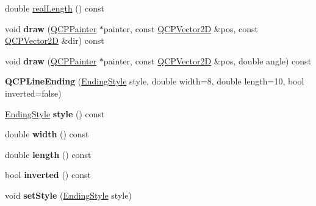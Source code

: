 \begin{DoxyCompactItemize}
\item 
double \hyperlink{class_q_c_p_line_ending_a6a528e6dc5aabe1077a573b045715f03}{real\+Length} () const 
\item 
void {\bfseries draw} (\hyperlink{class_q_c_p_painter}{Q\+C\+P\+Painter} $\ast$painter, const \hyperlink{class_q_c_p_vector2_d}{Q\+C\+P\+Vector2D} \&pos, const \hyperlink{class_q_c_p_vector2_d}{Q\+C\+P\+Vector2D} \&dir) const \hypertarget{class_q_c_p_line_ending_a59582c35dcdc23456326b7aefc929e2b}{}\label{class_q_c_p_line_ending_a59582c35dcdc23456326b7aefc929e2b}

\item 
void {\bfseries draw} (\hyperlink{class_q_c_p_painter}{Q\+C\+P\+Painter} $\ast$painter, const \hyperlink{class_q_c_p_vector2_d}{Q\+C\+P\+Vector2D} \&pos, double angle) const \hypertarget{class_q_c_p_line_ending_a045afaf5c8fa77623271d60e5d338288}{}\label{class_q_c_p_line_ending_a045afaf5c8fa77623271d60e5d338288}

\item 
{\bfseries Q\+C\+P\+Line\+Ending} (\hyperlink{class_q_c_p_line_ending_a5ef16e6876b4b74959c7261d8d4c2cd5}{Ending\+Style} style, double width=8, double length=10, bool inverted=false)\hypertarget{class_q_c_p_line_ending_abb2abc7542f0c7a3c081d878248896a4}{}\label{class_q_c_p_line_ending_abb2abc7542f0c7a3c081d878248896a4}

\item 
\hyperlink{class_q_c_p_line_ending_a5ef16e6876b4b74959c7261d8d4c2cd5}{Ending\+Style} {\bfseries style} () const \hypertarget{class_q_c_p_line_ending_aea324dbfddbca9895ca8a3a968671299}{}\label{class_q_c_p_line_ending_aea324dbfddbca9895ca8a3a968671299}

\item 
double {\bfseries width} () const \hypertarget{class_q_c_p_line_ending_a028328ee3fb139a40acaf65fb56edf67}{}\label{class_q_c_p_line_ending_a028328ee3fb139a40acaf65fb56edf67}

\item 
double {\bfseries length} () const \hypertarget{class_q_c_p_line_ending_a1744315d7b73f6e7ead3621e2cb18c28}{}\label{class_q_c_p_line_ending_a1744315d7b73f6e7ead3621e2cb18c28}

\item 
bool {\bfseries inverted} () const \hypertarget{class_q_c_p_line_ending_aa4ffbb182cbc89fc3d92eb348630502c}{}\label{class_q_c_p_line_ending_aa4ffbb182cbc89fc3d92eb348630502c}

\item 
void {\bfseries set\+Style} (\hyperlink{class_q_c_p_line_ending_a5ef16e6876b4b74959c7261d8d4c2cd5}{Ending\+Style} style)\hypertarget{class_q_c_p_line_ending_a56953b9cb8ed1bed0f025c3935f16910}{}\label{class_q_c_p_line_ending_a56953b9cb8ed1bed0f025c3935f16910}


\end{DoxyCompactItemize}
